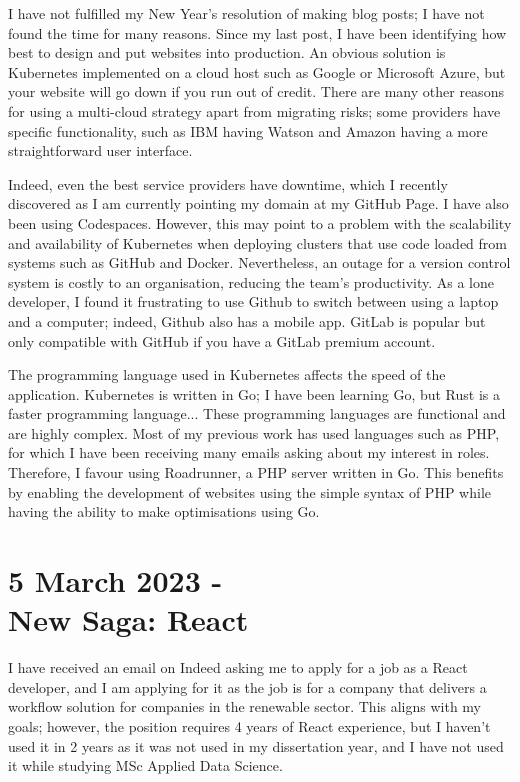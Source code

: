 \documentclass{article}
\begin{document}
I have not fulfilled my New Year's resolution of making blog posts; I have not found the time for many reasons. Since my last post, I have been identifying how best to design and put websites into production. An obvious solution is Kubernetes implemented on a cloud host such as Google or Microsoft Azure, but your website will go down if you run out of credit. There are many other reasons for using a multi-cloud strategy apart from migrating risks; some providers have specific functionality, such as IBM having Watson and Amazon having a more straightforward user interface. 

Indeed, even the best service providers have downtime, which I recently discovered as I am currently pointing my domain at my GitHub Page. I have also been using Codespaces. However, this may point to a problem with the scalability and availability of Kubernetes when deploying clusters that use code loaded from systems such as GitHub and Docker. Nevertheless, an outage for a version control system is costly to an organisation, reducing the team's productivity. As a lone developer, I found it frustrating to use Github to switch between using a laptop and a computer; indeed, Github also has a mobile app. GitLab is popular but only compatible with GitHub if you have a GitLab premium account.

The programming language used in Kubernetes affects the speed of the application. Kubernetes is written in Go; I have been learning Go, but Rust is a faster programming language... These programming languages are functional and are highly complex. Most of my previous work has used languages such as PHP, for which I have been receiving many emails asking about my interest in roles. Therefore, I favour using Roadrunner, a PHP server written in Go. This benefits by enabling the development of websites using the simple syntax of PHP while having the ability to make optimisations using Go.




\section*{5 March 2023 - \\ New Saga: React}
I have received an email on Indeed asking me to apply for a job as a React developer, and I am applying for it as the job is for a company that delivers a workflow solution for companies in the renewable sector. This aligns with my goals; however, the position requires 4 years of React experience, but I haven't used it in 2 years as it was not used in my dissertation year, and I have not used it while studying MSc Applied Data Science. 
\end{document}

